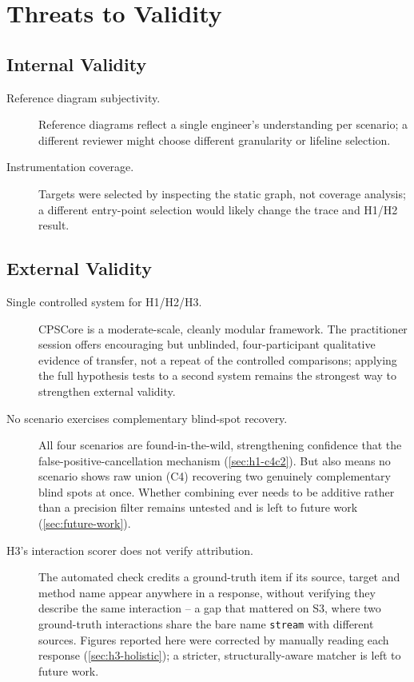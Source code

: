 \section{Threats to Validity}

\subsection{Internal Validity}

\begin{description}
  \item[Reference diagram subjectivity.] Reference diagrams reflect a
    single engineer's understanding per scenario; a different reviewer
    might choose different granularity or lifeline selection.

  \item[Instrumentation coverage.] Targets were selected by inspecting
    the static graph, not coverage analysis; a different entry-point
    selection would likely change the trace and H1/H2 result.
\end{description}

\subsection{External Validity}

\begin{description}
  \item[Single controlled system for H1/H2/H3.] CPSCore is a
    moderate-scale, cleanly modular framework. The practitioner session
    offers encouraging but unblinded, four-participant qualitative
    evidence of transfer, not a repeat of the controlled comparisons;
    applying the full hypothesis tests to a second system remains the
    strongest way to strengthen external validity.

  \item[No scenario exercises complementary blind-spot recovery.] All
    four scenarios are found-in-the-wild,
    strengthening confidence that the false-positive-cancellation
    mechanism (\cref{sec:h1-c4c2}). But also means no scenario shows raw union (C4) recovering two
    genuinely complementary blind spots at once. Whether combining ever needs to be additive rather than a precision filter remains untested and is
    left to future work (\cref{sec:future-work}).

  \item[H3's interaction scorer does not verify attribution.] The
    automated check credits a ground-truth item if its source, target
    and method name appear anywhere in a response, without verifying
    they describe the same interaction -- a gap that mattered on S3,
    where two ground-truth interactions share the bare name
    \texttt{stream} with different sources. Figures reported here were
    corrected by manually reading each response
    (\cref{sec:h3-holistic}); a stricter, structurally-aware matcher is
    left to future work.
\end{description}

